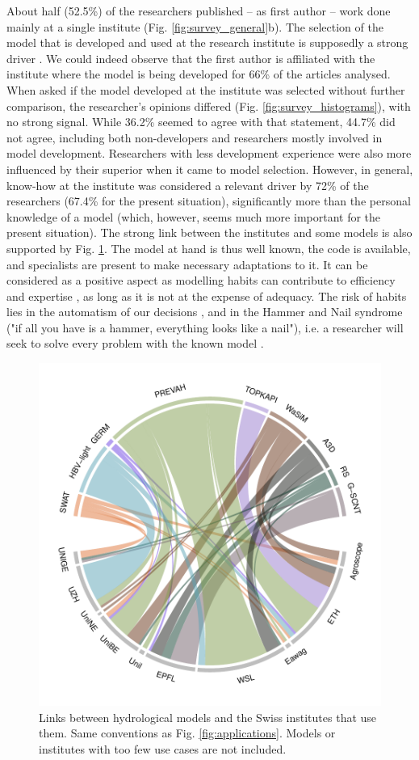 \documentclass[10pt,a4paper]{article}
\begin{document}
About half (52.5\%) of the researchers published -- as first author -- work done mainly at a single institute (Fig. \ref{fig:survey_general}b). The selection of the model that is developed and used at the research institute is supposedly a strong driver \citep{Addor2019}. We could indeed observe that the first author is affiliated with the institute where the model is being developed for 66\% of the articles analysed. When asked if the model developed at the institute was selected without further comparison, the researcher's opinions differed (Fig. \ref{fig:survey_histograms}), with no strong signal. While 36.2\% seemed to agree with that statement, 44.7\% did not agree, including both non-developers and researchers mostly involved in model development. Researchers with less development experience were also more influenced by their superior when it came to model selection. However, in general, know-how at the institute was considered a relevant driver by 72\% of the researchers (67.4\% for the present situation), significantly more than the personal knowledge of a model (which, however, seems much more important for the present situation). The strong link between the institutes and some models is also supported by Fig. \ref{fig:model-institutes}. The model at hand is thus well known, the code is available, and specialists are present to make necessary adaptations to it. It can be considered as a positive aspect as modelling habits can contribute to efficiency and expertise \citep{Babel2019}, as long as it is not at the expense of adequacy. The risk of habits lies in the automatism of our decisions \citep{Babel2019}, and in the Hammer and Nail syndrome ("if all you have is a hammer, everything looks like a nail"), i.e. a researcher will seek to solve every problem with the known model \citep{Hamalainen2015}.

\begin{figure}[htb]
	\begin{center}
		\includegraphics[width=0.70\columnwidth]{figures/chord_diagram_institutes}
		\caption{{Links between hydrological models and the Swiss institutes that use them. Same conventions as Fig. \ref{fig:applications}. Models or institutes with too few use cases are not included.
		{\label{fig:model-institutes}}
		}}
	\end{center}
\end{figure}
\end{document}
